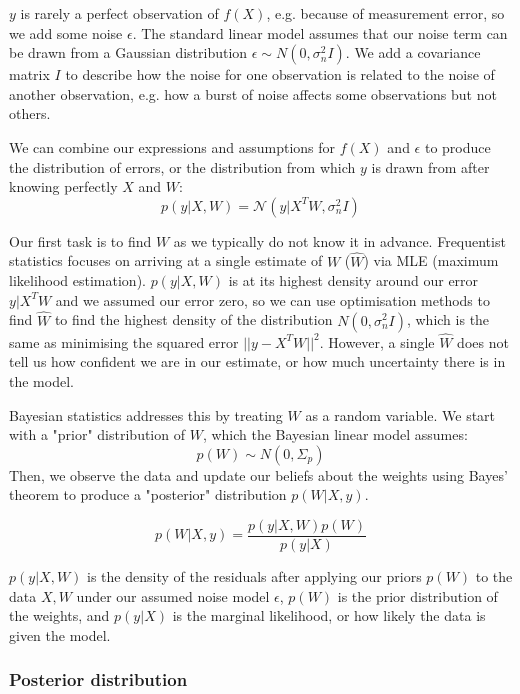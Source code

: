 \documentclass[10pt]{article}
\begin{document}
$y$ is rarely a perfect observation of $f(X)$, e.g. because of measurement error, so we add some noise $\epsilon$. The standard linear model assumes that our noise term can be drawn from a Gaussian distribution $\epsilon \sim N(0, \sigma_n^2I)$. We add a covariance matrix $I$ to describe how the noise for one observation is related to the noise of another observation, e.g. how a burst of noise affects some observations but not others. 

We can combine our expressions and assumptions for $f(X)$ and $\epsilon$ to produce the distribution of errors, or the distribution from which $y$ is drawn from after knowing perfectly $X$ and $W$:
\begin{equation*}
    p(y|X,W) = \mathcal{N}(y | X^TW, \sigma^2_nI)
\end{equation*}

Our first task is to find $W$ as we typically do not know it in advance. Frequentist statistics focuses on arriving at a single estimate of $W$ ($\hat{W}$) via MLE (maximum likelihood estimation). $p(y|X,W)$ is at its highest density around our error $y | X^TW$ and we assumed our error zero, so we can use optimisation methods to find $\hat{W}$ to find the highest density of the distribution $N(0, \sigma^2_nI)$, which is the same as minimising the squared error $||y - X^TW||^2$. However, a single $\hat{W}$ does not tell us how confident we are in our estimate, or how much uncertainty there is in the model. 

Bayesian statistics addresses this by treating $W$ as a random variable. We start with a "prior" distribution of $W$, which the Bayesian linear model assumes:
\begin{equation} \label{eq:prior_distribution}
    p(W) \sim N(0, \Sigma_p)
\end{equation}
Then, we observe the data and update our beliefs about the weights using Bayes' theorem to produce a "posterior" distribution $p(W|X,y)$.

\begin{equation*}
    p(W|X,y) = \frac{p(y|X,W)p(W)}{p(y|X)}
\end{equation*}

$p(y|X,W)$ is the density of the residuals after applying our priors $p(W)$ to the data $X,W$ under our assumed noise model $\epsilon$, $p(W)$ is the prior distribution of the weights, and $p(y|X)$ is the marginal likelihood, or how likely the data is given the model.   


\subsubsection{Posterior distribution}
\end{document}
